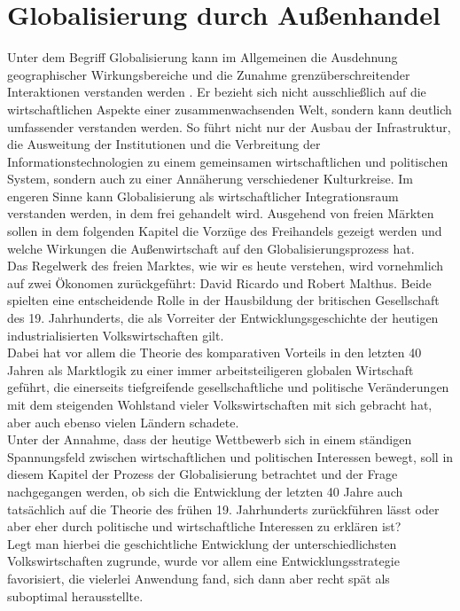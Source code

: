 \chapter[Globalisierung durch Außenhandel]{Globalisierung durch Außenhandel}\label{sec:Globalisierung}
Unter dem Begriff Globalisierung kann im Allgemeinen die Ausdehnung geographischer Wirkungsbereiche und die Zunahme grenzüberschreitender Interaktionen verstanden werden \cite[Kapitel 3, S. 35]{Kessler.2009}. Er bezieht sich nicht ausschließlich auf die wirtschaftlichen Aspekte einer zusammenwachsenden Welt, sondern kann deutlich umfassender verstanden werden. So führt nicht nur der Ausbau der Infrastruktur, die Ausweitung der Institutionen und die Verbreitung der Informationstechnologien zu einem gemeinsamen wirtschaftlichen und politischen System, sondern auch zu einer Annäherung verschiedener Kulturkreise. Im engeren Sinne kann Globalisierung als wirtschaftlicher Integrationsraum verstanden werden, in dem frei gehandelt wird. Ausgehend von freien Märkten sollen in dem folgenden Kapitel die Vorzüge des Freihandels gezeigt werden und welche Wirkungen die Außenwirtschaft auf den Globalisierungsprozess hat.\\
%
Das Regelwerk des freien Marktes, wie wir es heute verstehen, wird vornehmlich auf zwei Ökonomen zurückgeführt: David Ricardo und Robert Malthus. Beide spielten eine entscheidende Rolle in der Hausbildung der britischen Gesellschaft des 19. Jahrhunderts, die als Vorreiter der Entwicklungsgeschichte der heutigen industrialisierten Volkswirtschaften gilt.\\
%
Dabei hat vor allem die Theorie des komparativen Vorteils in den letzten 40 Jahren als Marktlogik zu einer immer arbeitsteiligeren globalen Wirtschaft geführt, die einerseits tiefgreifende gesellschaftliche und politische Veränderungen mit dem steigenden Wohlstand vieler Volkswirtschaften mit sich gebracht hat, aber auch ebenso vielen Ländern schadete.\\
%
Unter der Annahme, dass der heutige Wettbewerb sich in einem ständigen Spannungsfeld zwischen wirtschaftlichen und politischen Interessen bewegt, soll in diesem Kapitel der Prozess der Globalisierung betrachtet und der Frage nachgegangen werden, ob sich die Entwicklung der letzten 40 Jahre auch tatsächlich auf die Theorie des frühen 19. Jahrhunderts zurückführen lässt oder aber eher durch politische und wirtschaftliche Interessen zu erklären ist? \\
%
Legt man hierbei die geschichtliche Entwicklung der unterschiedlichsten Volkswirtschaften zugrunde, wurde vor allem eine Entwicklungsstrategie favorisiert, die vielerlei Anwendung fand, sich dann aber recht spät als suboptimal herausstellte.\\ 
